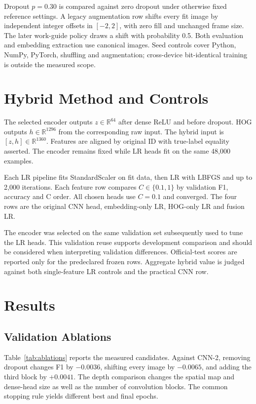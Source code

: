 \documentclass[conference]{IEEEtran}
\begin{document}
Dropout $p=0.30$ is compared against zero dropout under otherwise fixed reference
settings. A legacy augmentation row shifts every fit image by independent
integer offsets in $[-2,2]$, with zero fill and unchanged frame size. The later
work-guide policy draws a shift with probability 0.5. Both evaluation and
embedding extraction use canonical images. Seed controls cover Python, NumPy,
PyTorch, shuffling and augmentation; cross-device bit-identical training is
outside the measured scope.

\section{Hybrid Method and Controls}
The selected encoder outputs $z\in\mathbb{R}^{64}$ after dense ReLU and before
dropout. HOG outputs $h\in\mathbb{R}^{1296}$ from the corresponding raw input.
The hybrid input is $[z,h]\in\mathbb{R}^{1360}$. Features are aligned by original
ID with true-label equality asserted. The encoder remains fixed while LR heads
fit on the same 48,000 examples.

Each LR pipeline fits StandardScaler on fit data, then LR with LBFGS and up to
2,000 iterations. Each feature row compares $C\in\{0.1,1\}$ by validation F1,
accuracy and C order. All chosen heads use $C=0.1$ and converged. The four rows
are the original CNN head, embedding-only LR, HOG-only LR and fusion LR.

The encoder was selected on the same validation set subsequently used to tune
the LR heads. This validation reuse supports development comparison and should
be considered when interpreting validation differences. Official-test scores
are reported only for the predeclared frozen rows. Aggregate hybrid value is
judged against both single-feature LR controls and the practical CNN row.

\section{Results}
\subsection{Validation Ablations}
Table~\ref{tab:ablations} reports the measured candidates. Against CNN-2,
removing dropout changes F1 by $-0.0036$, shifting every image by $-0.0065$,
and adding the third block by $+0.0041$. The depth comparison changes the
spatial map and dense-head size as well as the number of convolution blocks.
The common stopping rule yields different best and final epochs.
\end{document}
